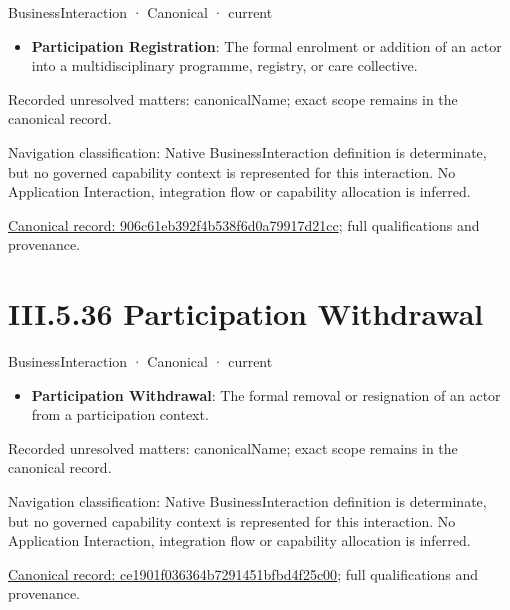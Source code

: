 \label{element:906c61eb392f4b538f6d0a79917d21cc}
{\small BusinessInteraction · Canonical · current}\par

\begin{itemize}


\item \textbf{Participation Registration}: The formal enrolment or addition of an actor into a multidisciplinary programme, registry, or care collective.

\end{itemize}

{\small Recorded unresolved matters: canonicalName; exact scope remains in the canonical record.}\par
{\small Navigation classification: Native BusinessInteraction definition is determinate, but no governed capability context is represented for this interaction. No Application Interaction, integration flow or capability allocation is inferred.}\par
{\footnotesize \href{../../../../../../../../continuum/business/business-interaction/906c61eb392f4b538f6d0a79917d21cc.md}{Canonical record: 906c61eb392f4b538f6d0a79917d21cc}; full qualifications and provenance.}\par
\section*{III.5.36 Participation Withdrawal}
\label{navigation:III.5.36}

\label{element:ce1901f036364b7291451bfbd4f25c00}
{\small BusinessInteraction · Canonical · current}\par

\begin{itemize}


\item \textbf{Participation Withdrawal}: The formal removal or resignation of an actor from a participation context.

\end{itemize}

{\small Recorded unresolved matters: canonicalName; exact scope remains in the canonical record.}\par
{\small Navigation classification: Native BusinessInteraction definition is determinate, but no governed capability context is represented for this interaction. No Application Interaction, integration flow or capability allocation is inferred.}\par
{\footnotesize \href{../../../../../../../../continuum/business/business-interaction/ce1901f036364b7291451bfbd4f25c00.md}{Canonical record: ce1901f036364b7291451bfbd4f25c00}; full qualifications and provenance.}\par
